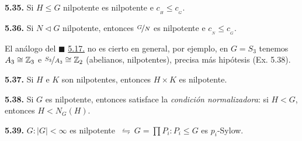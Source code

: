 
\begin{theorem}
    \textbf{5.35.} Si \(H\leq G\) nilpotente es nilpotente e \(c_{_H} \leq c_{_G}\). 
\end{theorem}

\begin{theorem}
    \textbf{5.36.} Si \(N\lhd G\) nilpotente, entonces \(\nicefrac{G}{N}\) es nilpotente e \(c_{_N} \leq c_{_G}\). 
\end{theorem}

\begin{note}
    El análogo del \(\blacksquare\) \hyperlink{thm517}{5.17.} no es cierto en general, por ejemplo, en \(G = S_3\) tenemos \(A_3 \cong \mathbb{Z}_3\) e \(\nicefrac{S_3}{A_3} \cong \mathbb{Z}_2\) (abelianos, nilpotentes), precisa más hipótesis (\textcolor{rojoscuro}{Ex. 5.38}).    
\end{note}

\hypertarget{thm537}{}
\begin{theorem}
    \textbf{5.37.} Si \(H\) e \(K\) son nilpotentes, entonces \(H\times K\) es nilpotente. 
\end{theorem}

\hypertarget{thm538}{}
\begin{theorem}
    \textbf{5.38.} Si \(G\) es nilpotente, entonces satisface la \emph{condición normalizadora}: si \(H< G\), entonces \(H < N_G(H)\). 
\end{theorem}


\hypertarget{thm539}{}
\begin{theorem}
    \textbf{5.39.} \(G : |G| < \infty\) es nilpotente \( \ \leftrightharpoons \  G = \prod P_i: P_i \leq G\) es $p_i$-Sylow. 
\end{theorem}

